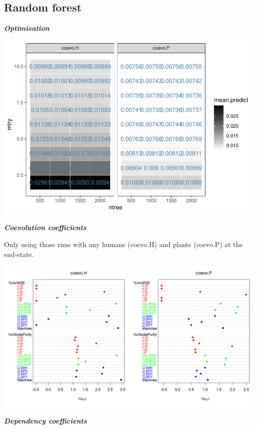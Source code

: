 \documentclass[]{book}
\begin{document}
\newpage

\hypertarget{random-forest}{%
\subsection{Random forest}\label{random-forest}}

\textbf{\emph{Optimisation}}

\includegraphics[width=1\linewidth]{hpcModel-exploration_files/figure-latex/5_RF.coevo.tunning-plot-1}

\newpage

\textbf{\emph{Coevolution coefficients}}

Only using those runs with any humans (coevo.H) and plants (coevo.P) at the end-state.

\includegraphics[width=1\linewidth]{plots/5_multiplePar-RF-coevo}

\newpage

\textbf{\emph{Dependency coefficients}}
\end{document}
